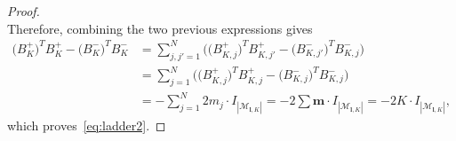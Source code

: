 \documentclass[10pt,a4paper]{amsart}
\def\Bm{B^{-}}
\def\Bp{B^{+}}
\def\bbm{{\bm m}}
\def\bl{{\bm l}}
\def\calM{\mathcal{M}}
\newcommand{\card}[1]{|{#1}|}
\begin{document}
\begin{proof}
\[    \]
Therefore, combining the two previous expressions gives
\begin{align*}
    \big(\Bp_K\big)^T\Bp_K  - \big(\Bm_K\big)^T\Bm_K 
    & = 
 \sum_{j,j'=1}^N 
            \Big( \big(\Bp_{K,j}\big)^T
            \Bp_{K,j'}
             - \big(\Bm_{K,j'}\big)^T \Bm_{K,j} \Big)
             \nonumber \\
        &= \sum_{j=1}^N 
            \Big( \big(\Bp_{K,j}\big)^T \Bp_{K,j}
             - \big(\Bm_{K,j}\big)^T \Bm_{K,j} \Big) \nonumber \\
        &= -\sum_{j=1}^N 2m_j\cdot I_{\card{\calM_{\bl,K}}} = -2\sum\bbm \cdot I_{\card{\calM_{\bl,K}}} = -2K\cdot I_{\card{\calM_{\bl,K}}},
\end{align*}
which proves~\eqref{eq:ladder2}.
\end{proof}
\end{document}
